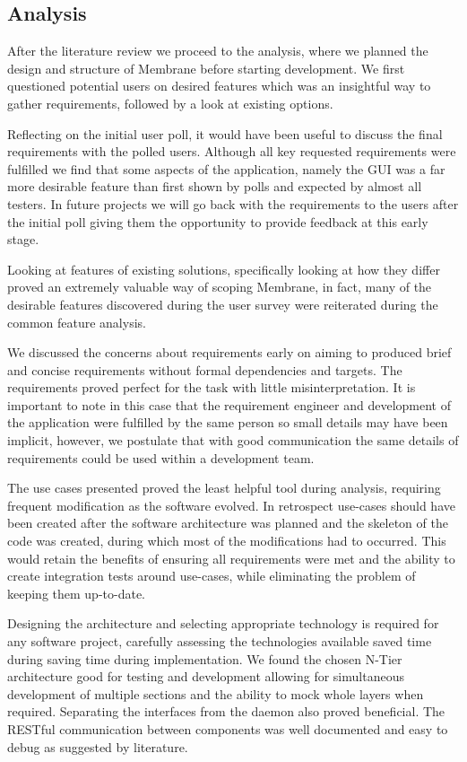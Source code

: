 \documentclass[11pt, a4paper, twocolumn, twoside]{report}
\begin{document}
\subsection{Analysis}

After the literature review we proceed to the analysis, where we planned the design and structure of Membrane before starting development. We first questioned potential users on desired features which was an insightful way to gather requirements, followed by a look at existing options.

Reflecting  on the initial user poll, it would have been useful to discuss the final requirements with the polled users. Although all key requested requirements were fulfilled we find that some aspects of the application, namely the GUI was a far more desirable feature than first shown by polls and expected by almost all testers. In future projects we will go back with the requirements to the users after the initial poll giving them the opportunity to provide feedback at this early stage.

Looking at features of existing solutions, specifically looking at how they differ proved an extremely valuable way of scoping Membrane, in fact, many of the desirable features discovered during the user survey were reiterated during the common feature analysis.

We discussed the concerns about requirements early on aiming to produced brief and concise requirements without formal dependencies and targets. The requirements proved perfect for the task with little misinterpretation. It is important to note in this case that the requirement engineer and development of the application were fulfilled by the same person so small details may have been implicit, however, we postulate that with good communication the same details of requirements could be used within a development team.

The use cases presented proved the least helpful tool during analysis, requiring frequent modification as the software evolved. In retrospect use-cases should have been created after the software architecture was planned and the skeleton of the code was created, during which most of the modifications had to occurred. This would retain the benefits of ensuring all requirements were met and the ability to create integration tests around use-cases, while eliminating the problem of keeping them up-to-date.

Designing the architecture and selecting appropriate technology is required for any software project, carefully assessing the technologies available saved time during  saving time during implementation. We found the chosen N-Tier architecture good for testing and development allowing for simultaneous development of multiple sections and the ability to mock whole layers when required. Separating the interfaces from the daemon also proved beneficial. The RESTful communication between components was well documented and easy to debug as suggested by literature.
\end{document}

